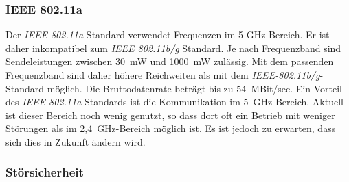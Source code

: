         \subsubsection{IEEE 802.11a}
            Der \emph{IEEE 802.11a} Standard verwendet Frequenzen im 5-GHz-Bereich. Er ist daher
            inkompatibel zum \emph{IEEE 802.11b/g} Standard. Je nach Frequenzband sind 
            Sendeleistungen zwischen 30~mW und 1000~mW zulässig. Mit dem passenden Frequenzband
            sind daher höhere Reichweiten als mit dem \emph{IEEE-802.11b/g}-Standard möglich.
            Die Bruttodatenrate beträgt bis zu 54~MBit/sec. 
            Ein Vorteil des \emph{IEEE-802.11a}-Standards ist die Kommunikation im 5~GHz Bereich.
            Aktuell ist dieser Bereich noch wenig genutzt, so dass dort
            oft ein Betrieb mit weniger Störungen als im 2,4~GHz-Bereich möglich ist.
            Es ist jedoch zu erwarten, dass sich dies in Zukunft ändern wird.

        \subsubsection{Störsicherheit}\label{WlanStoersicherheit}

